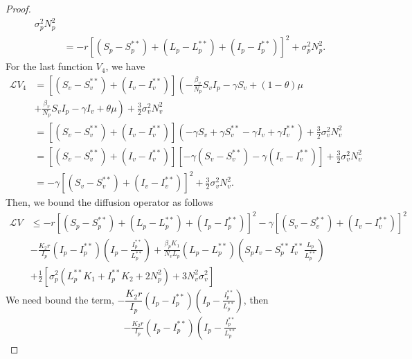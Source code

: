 \begin{proof}
\begin{align*}
				\sigma_p^2 N_p^2
			\\
			&=
				-r
				\left[
					(S_p - S_p ^{**}) + 
					(L_p - L_p ^{**}) +
					(I_p - I_p^{**})
				\right] ^ 2 + 
				\sigma_p^2 N_p^2.
	\end{align*}
	For the last function $V_4$, we have
	\begin{align*}
		\mathcal{L}V_4
			&= 
				\left[
					(S_v - S_v ^{**}) + 
					(I_v - I_v ^{**})
				\right]
				\left( - 
					\frac{\beta_v}{N_p} S_vI_p -
					\gamma S_v + 
					(1 - \theta) 
					\mu 
				\right.\\
			&+
				\left.
					\frac{\beta_v}{N_p}
					S_v I_p - 
					\gamma I_v + 
					\theta \mu 
				\right) + 
				\frac{3}{2}
				\sigma_v ^ 2 N_v ^ 2
				\\
			&=
				\left[
					(S_v - S_v^{**}) + 
					(I_v - I_v^{**})
				\right]
				(-\gamma S_v + \gamma S_v^{**} - \gamma I_v + \gamma I_v^{**}) + 
				\frac{3}{2}
				\sigma_v ^ 2 N_v ^ 2
			\\
			&=
				\left[
					(S_v - S_v ^{**}) + 
					(I_v - I_v ^{**})
				\right]
				\left[
					-\gamma (S_v - S_v^{**})
					-\gamma (I_v - I_v^{**})
				\right] + 
				\frac{3}{2}
				\sigma_v ^ 2 N_v ^ 2
				\\
			&=
				-\gamma 
				\left[
					(S_v - S_v ^{**}) + 
					(I_v - I_v^{**})
				\right] ^2 + 
				\frac{3}{2}
				\sigma_v ^2 N_v^2.
	\end{align*}
	Then, we bound the diffusion operator as follows
	\begin{align*}
		\mathcal{L}V 
			&\leq 
				-r 
				\left[
					(S_p - S_p ^{**}) + 
					(L_p - L_p ^{**}) +
					(I_p - I_p ^{**})
				\right] ^2 - 
				\gamma 
				\left[
					(S_v - S_v^{**}) + 
					(I_v - I_v^{**})
				\right] ^ 2
			\\
			&
				-\frac{K_2 r}{I_p} (I_p - I_p ^{**})
				\left(
					I_p - 
					\frac{I_p^{**}}{L_p^{**}}
				\right) + 
				\frac{\beta_p K_1}{N_vL_p}
				(L_p - L_p ^{**})
				\left(
					S_pI_v - S_p ^{**} I_v^{**}
					\frac{L_p}{L_p^{**}}
				\right)
			\\
			&+
				\frac{1}{2}
				\left[
					\sigma_p^2
					(L_p ^{**} K_1 + I_p ^{**} K_2 + 2N_p ^ 2) + 
					3 N_v ^ 2 
					\sigma_v ^ 2
				\right]
	\end{align*}
%
	We need bound the term,
	$
		-\dfrac{K_2r}{I_p} (I_p-I_p^{**})
		\left(
			I_p - \frac{I_p^{**}}{L_p^{**}}
		\right)
	$, 
	then
	\begin{align*}
		-\frac{K_2r}{I_p}
		(I_p - I_p ^{**})
		\left(
			I_p - \frac{I_p^{**}}{L_p^{**}}

\end{align*}
\end{proof}
